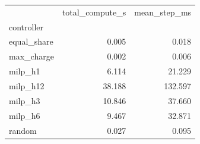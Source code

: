 \begin{tabular}{lrr}
\toprule
 & total_compute_s & mean_step_ms \\
controller &  &  \\
\midrule
equal_share & 0.005 & 0.018 \\
max_charge & 0.002 & 0.006 \\
milp_h1 & 6.114 & 21.229 \\
milp_h12 & 38.188 & 132.597 \\
milp_h3 & 10.846 & 37.660 \\
milp_h6 & 9.467 & 32.871 \\
random & 0.027 & 0.095 \\
\bottomrule
\end{tabular}
